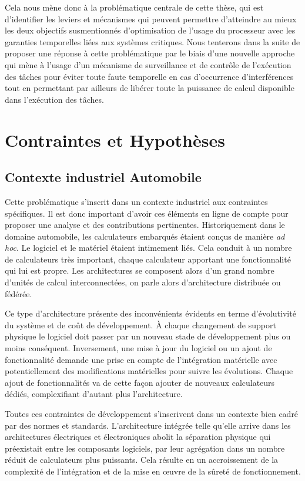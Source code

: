 \documentclass[french, a4paper, 11pt, twoside, pdftex]{StyleThese}
\begin{document}
		Cela nous mène donc à la problématique centrale de cette thèse, qui est d'identifier les leviers et mécanismes qui peuvent permettre d'atteindre au mieux les deux objectifs susmentionnés d'optimisation de l'usage du processeur avec les garanties temporelles liées aux systèmes critiques. 
		Nous tenterons dans la suite de proposer une réponse à cette problématique par le biais d'une nouvelle approche qui mène à l'usage d'un mécanisme de surveillance et de contrôle de l'exécution des tâches pour éviter toute faute temporelle en cas d'occurrence d'interférences tout en permettant par ailleurs de libérer toute la puissance de calcul disponible dans l'exécution des tâches.
	

\section{Contraintes et Hypothèses}
		
	\subsection{Contexte industriel Automobile}
		Cette problématique s'inscrit dans un contexte industriel aux contraintes spécifiques. Il est donc important d'avoir ces éléments en ligne de compte pour proposer une analyse et des contributions pertinentes. Historiquement dans le domaine automobile, les calculateurs embarqués étaient conçus de manière \emph{ad hoc}. Le logiciel et le matériel étaient intimement liés. Cela conduit à un nombre de calculateurs très important, chaque calculateur apportant une fonctionnalité qui lui est propre. Les architectures se composent alors d'un grand nombre d'unités de calcul interconnectées, on parle alors d'architecture distribuée ou fédérée. 

		Ce type d'architecture présente des inconvénients évidents en terme d'évolutivité du système et de coût de développement. À chaque changement de support physique le logiciel doit passer par un nouveau stade de développement plus ou moins conséquent. Inversement, une mise à jour du logiciel ou un ajout de fonctionnalité demande une prise en compte de l'intégration matérielle avec potentiellement des modifications matérielles pour suivre les évolutions. Chaque ajout de fonctionnalités va de cette façon ajouter de nouveaux calculateurs dédiés, complexifiant d'autant plus l'architecture.
		
		Toutes ces contraintes de développement s'inscrivent dans un contexte bien cadré par des normes et standards. L’architecture intégrée telle qu'elle arrive dans les architectures électriques et électroniques abolit la séparation physique qui préexistait entre les composants logiciels, par leur agrégation dans un nombre réduit de calculateurs plus puissants. Cela résulte en un accroissement de la complexité de l’intégration et de la mise en œuvre de la sûreté de fonctionnement. 
	
\end{document}
